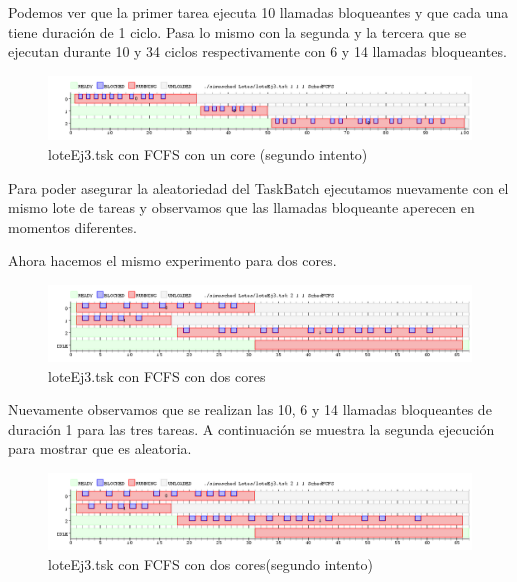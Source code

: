 Podemos ver que la primer tarea ejecuta 10 llamadas bloqueantes y que cada una tiene duración de 1 ciclo. Pasa lo mismo con la segunda y la tercera que se ejecutan durante 10
 y 34 ciclos respectivamente con 6 y 14 llamadas bloqueantes.

\begin{figure}[H]
  \centering
    \includegraphics[width=1.1\textwidth]{imagenes/Ej3Experimento2.png}
  \caption{loteEj3.tsk con FCFS con un core (segundo intento)}
\end{figure}

Para poder asegurar la aleatoriedad del TaskBatch ejecutamos nuevamente con el mismo lote de tareas y observamos que las llamadas bloqueante aperecen en momentos diferentes.

Ahora hacemos el mismo experimento para dos cores.

\begin{figure}[H]
  \centering
    \includegraphics[width=1.1\textwidth]{imagenes/Ej3Experimento3.png}
  \caption{loteEj3.tsk con FCFS con dos cores}
\end{figure}

Nuevamente observamos que se realizan las 10, 6 y 14 llamadas bloqueantes de duración 1 para las tres tareas. A continuación se muestra la segunda ejecución para mostrar 
que es aleatoria.


\begin{figure}[H]
  \centering
    \includegraphics[width=1.1\textwidth]{imagenes/Ej3Experimento4.png}
  \caption{loteEj3.tsk con FCFS con dos cores(segundo intento)}
\end{figure}